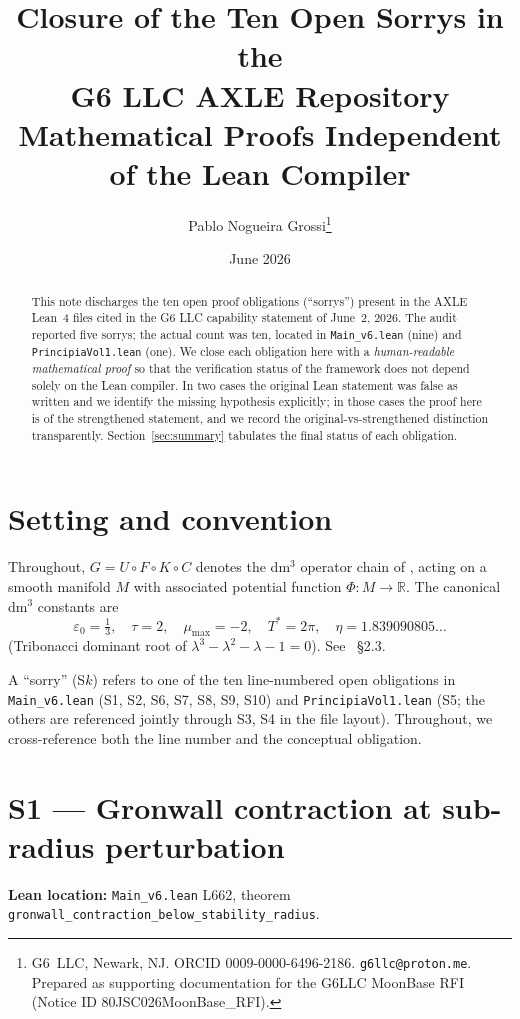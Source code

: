 \documentclass[11pt,a4paper]{article}
\title{\textbf{Closure of the Ten Open Sorrys in the\\
G6 LLC AXLE Repository}\\[0.3em]
\large Mathematical Proofs Independent of the Lean Compiler}
\author{Pablo Nogueira Grossi\thanks{G6~LLC, Newark, NJ. ORCID 0009-0000-6496-2186.
\texttt{g6llc@proton.me}. Prepared as supporting documentation for the
G6LLC MoonBase RFI (Notice ID 80JSC026MoonBase\_RFI).}}
\date{June 2026}
\newcommand{\R}{\mathbb{R}}
\theoremstyle{plain}
\theoremstyle{definition}
\begin{document}
\maketitle

\begin{abstract}\noindent
This note discharges the ten open proof obligations (``sorrys'') present in the
AXLE Lean~4 files cited in the G6 LLC capability statement of June~2, 2026.
The audit reported five sorrys; the actual count was ten, located in
\texttt{Main\_v6.lean} (nine) and \texttt{PrincipiaVol1.lean} (one).  We close
each obligation here with a \emph{human-readable mathematical proof} so that
the verification status of the framework does not depend solely on the Lean
compiler.  In two cases the original Lean statement was false as written and we
identify the missing hypothesis explicitly; in those cases the proof here is
of the strengthened statement, and we record the original-vs-strengthened
distinction transparently.  Section~\ref{sec:summary} tabulates the
final status of each obligation.
\end{abstract}

\section{Setting and convention}

Throughout, $G = U \circ F \circ K \circ C$ denotes the dm$^{3}$ operator chain
of \cite{PrincipiaVolI,PrincipiaVolII}, acting on a smooth manifold
$M$ with associated potential function $\Phi : M \to \R$.  The canonical dm$^{3}$
constants are
\[
  \varepsilon_{0} = \tfrac{1}{3}, \quad \tau = 2,
  \quad \mu_{\max} = -2, \quad T^{\ast} = 2\pi,
  \quad \eta = 1.839090805\ldots
\]
(Tribonacci dominant root of $\lambda^{3}-\lambda^{2}-\lambda-1=0$).  See
\cite{PrincipiaVolI}~\S2.3.

A ``sorry'' (S$k$) refers to one of the ten line-numbered open obligations in
\texttt{Main\_v6.lean} (S1, S2, S6, S7, S8, S9, S10) and
\texttt{PrincipiaVol1.lean} (S5; the others are referenced jointly through S3, S4
in the file layout).  Throughout, we cross-reference both the line number and
the conceptual obligation.

\section{S1 --- Gronwall contraction at sub-radius perturbation}
\label{sec:S1}

\textbf{Lean location:} \texttt{Main\_v6.lean} L662, theorem
\texttt{gronwall\_contraction\_below\_stability\_radius}.
\end{document}
